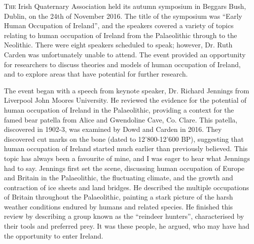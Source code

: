 \def\IJSRAidentifier{\currfilebase} %
\def\shorttitle{IQUA: Symposium Review}
\def\maintitle{Irish Quaternary Association (IQUA) Symposium Review}
\def\cmail{patricia.kenny@ucdconnect.ie}
\def\keywords{Conference, IQUA, Irish Quaternary Association, Prehistory, Review}
\def\abstract{}
\def\authorone{Patricia Kenny}
\def\bioone{Patricia Kenny graduated from University College Dublin with a BSc in Archaeology and Geology in 2015. She has since graduated with an MA in Archaeology, also at UCD. Her research interests include Irish prehistory, Neolithic Europe, the study of megalithic monuments and geoarchaeology. Patricia is currently working at UCD School of Archaeology as a tutor, and is planning upon starting a PhD within the next year, examining the structural stones of passage tombs in Atlantic Europe.}
\def\affilone{University College Dublin}

%
\IJSRAopening%
\lettrine{T}{he} 
Irish Quaternary Association held its autumn symposium in Beggars Bush, Dublin, on the 24th of November 2016. The title of the symposium was “Early Human Occupation of Ireland”, and the speakers covered a variety of topics relating to human occupation of Ireland from the Palaeolithic through to the Neolithic. There were eight speakers scheduled to speak; however, Dr. Ruth Carden was unfortunately unable to attend. The event provided an opportunity for researchers to discuss theories and models of human occupation of Ireland, and to explore areas that have potential for further research.

The event began with a speech from keynote speaker, Dr. Richard Jennings from Liverpool John Moores University. He reviewed the evidence for the potential of human occupation of Ireland in the Palaeolithic, providing a context for the famed bear patella from Alice and Gwendoline Cave, Co. Clare. This patella, discovered in 1902-3, was examined by Dowd and Carden in 2016. They discovered cut marks on the bone (dated to 12’800-12’600 BP), suggesting that human occupation of Ireland started much earlier than previously believed. This topic has always been a favourite of mine, and I was eager to hear what Jennings had to say.
Jennings first set the scene, discussing human occupation of Europe and Britain in the Palaeolithic, the fluctuating climate, and the growth and contraction of ice sheets and land bridges. He described the multiple occupations of Britain throughout the Palaeolithic, painting a stark picture of the harsh weather conditions endured by humans and related species. He finished this review by describing a group known as the “reindeer hunters”, characterised by their tools and preferred prey. It was these people, he argued, who may have had the opportunity to enter Ireland. 

